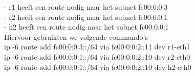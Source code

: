 - r1 heeft een route nodig naar het subnet fc00:0:0:3\\
- r2 heeft een route nodig naar het subnet fc00:0:0:1\\
- h2 heeft een route nodig naar het subnet fc00:0:0:1\\
Hiervoor gebruikten we volgende commando's\\
ip -6 route add fc00:0:0:3::/64 via fc00:0:0:2::11 dev r1-eth1\\
ip -6 route add fc00:0:0:1::/64 via fc00:0:0:2::10 dev r2-eth0\\
ip -6 route add fc00:0:0:1::/64 via fc00:0:0:2::10 dev h2-eth0